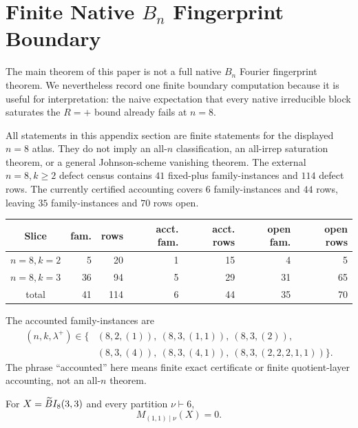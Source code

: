\section[Finite Native Bn Fingerprint Boundary]{Finite Native $B_n$ Fingerprint Boundary}\label{app:fullfingerprint}

The main theorem of this paper is not a full native $B_n$ Fourier fingerprint theorem.  We nevertheless record one
finite boundary computation because it is useful for interpretation: the naive expectation that every native irreducible
block saturates the $R=+$ bound already fails at $n=8$.

All statements in this appendix section are finite statements for the displayed $n=8$ atlas.  They do not imply an
all-$n$ classification, an all-irrep saturation theorem, or a general Johnson-scheme vanishing theorem.  The external
$n=8,k\ge2$ defect census contains $41$ fixed-plus family-instances and $114$ defect rows.  The currently certified
accounting covers $6$ family-instances and $44$ rows, leaving $35$ family-instances and $70$ rows open.

\begin{center}
\begingroup
\scriptsize
\setlength{\tabcolsep}{4pt}
\begin{tabular}{c|r|r|r|r|r|r}
\textbf{Slice} & \textbf{fam.} & \textbf{rows} & \textbf{acct. fam.} & \textbf{acct. rows} & \textbf{open fam.} & \textbf{open rows}\\
\hline
$n=8,k=2$ & 5 & 20 & 1 & 15 & 4 & 5\\
$n=8,k=3$ & 36 & 94 & 5 & 29 & 31 & 65\\
\hline
total & 41 & 114 & 6 & 44 & 35 & 70
\end{tabular}
\endgroup
\end{center}

The accounted family-instances are
\begin{align*}
(n,k,\lambda^+)\in\{&(8,2,(1)),\ (8,3,(1,1)),\ (8,3,(2)),\\
&(8,3,(4)),\ (8,3,(4,1)),\ (8,3,(2,2,2,1,1))\}.
\end{align*}
The phrase ``accounted'' here means finite exact certificate or finite quotient-layer accounting, not an all-$n$ theorem.

\begin{proposition}\label{prop:lambda11zero}
For $X=\widetilde{B}I_8(3,3)$ and every partition $\nu\vdash6$,
\[
  M_{(1,1)\mid\nu}(X)=0.
\]
\end{proposition}

